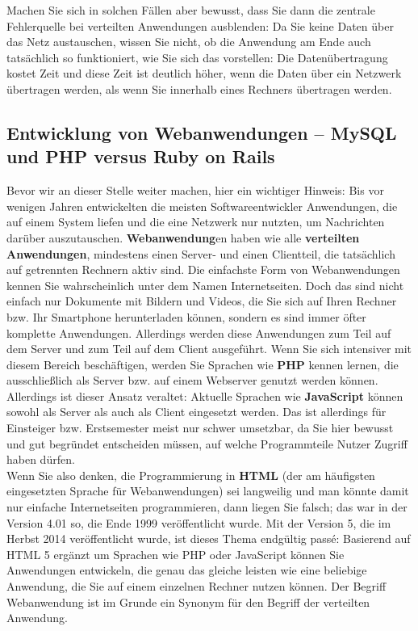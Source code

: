 Machen Sie sich in solchen Fällen aber bewusst, dass Sie dann die zentrale Fehlerquelle bei verteilten Anwendungen ausblenden: Da Sie keine Daten über das Netz austauschen, wissen Sie nicht, ob die Anwendung am Ende auch tatsächlich so funktioniert, wie Sie sich das vorstellen: Die Datenübertragung kostet Zeit und diese Zeit ist deutlich höher, wenn die Daten über ein Netzwerk übertragen werden, als wenn Sie innerhalb eines Rechners übertragen werden.

\subsection{Entwicklung von Webanwendungen – MySQL und PHP versus Ruby on Rails}
Bevor wir an dieser Stelle weiter machen, hier ein wichtiger Hinweis: Bis vor wenigen Jahren entwickelten die meisten Softwareentwickler Anwendungen, die auf einem System liefen und die eine Netzwerk nur nutzten, um Nachrichten darüber auszutauschen. \textbf{Webanwendung}en haben wie alle \textbf{verteilten Anwendungen}, mindestens einen Server- und einen Clientteil, die tatsächlich auf getrennten Rechnern aktiv sind. Die einfachste Form von Webanwendungen kennen Sie wahrscheinlich unter dem Namen Internetseiten. Doch das sind nicht einfach nur Dokumente mit Bildern und Videos, die Sie sich auf Ihren Rechner bzw. Ihr Smartphone herunterladen können, sondern es sind immer öfter komplette Anwendungen. Allerdings werden diese Anwendungen zum Teil auf dem Server und zum Teil auf dem Client ausgeführt. Wenn Sie sich intensiver mit diesem Bereich beschäftigen, werden Sie Sprachen wie \textbf{PHP} kennen lernen, die ausschließlich als Server bzw. auf einem Webserver genutzt werden können. Allerdings ist dieser Ansatz veraltet: Aktuelle Sprachen wie \textbf{JavaScript} können sowohl als Server als auch als Client eingesetzt werden. Das ist allerdings für Einsteiger bzw. Erstsemester meist nur schwer umsetzbar, da Sie hier bewusst und gut begründet entscheiden müssen, auf welche Programmteile Nutzer Zugriff haben dürfen.\\

Wenn Sie also denken, die Programmierung in \textbf{HTML} (der am häufigsten eingesetzten Sprache für Webanwendungen) sei langweilig und man könnte damit nur einfache Internetseiten programmieren, dann liegen Sie falsch; das war in der Version 4.01 so, die Ende 1999 veröffentlicht wurde. Mit der Version 5, die im Herbst 2014 veröffentlicht wurde, ist dieses Thema endgültig passé: Basierend auf HTML 5 ergänzt um Sprachen wie PHP oder JavaScript können Sie Anwendungen entwickeln, die genau das gleiche leisten wie eine beliebige Anwendung, die Sie auf einem einzelnen Rechner nutzen können. Der Begriff Webanwendung ist im Grunde ein Synonym für den Begriff der verteilten Anwendung.\\

